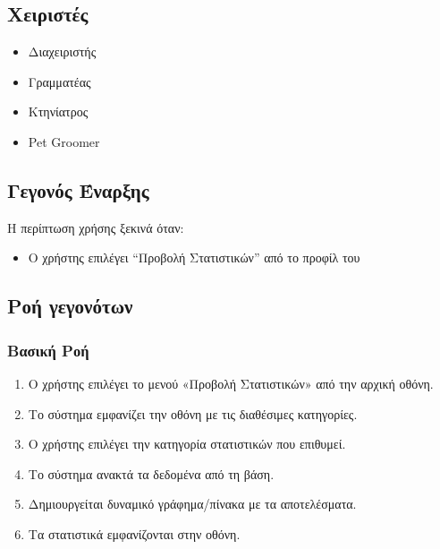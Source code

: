 \documentclass[12pt,a4paper,twoside]{book}
\begin{document}
\subsection{Χειριστές}
\begin{itemize}
  \item Διαχειριστής
  \item Γραμματέας
  \item Κτηνίατρος
  \item Pet Groomer
\end{itemize}

\subsection{Γεγονός Έναρξης}
Η περίπτωση χρήσης ξεκινά όταν:
\begin{itemize}
  \item Ο χρήστης επιλέγει “Προβολή Στατιστικών” από το προφίλ του   %
\end{itemize}

\subsection{Ροή γεγονότων}

\subsubsection{Βασική Ροή}
\begin{enumerate}
  \item Ο χρήστης επιλέγει το μενού «Προβολή Στατιστικών» από την αρχική οθόνη. %
  \item Το σύστημα εμφανίζει την οθόνη με τις διαθέσιμες κατηγορίες. %
  \item Ο χρήστης επιλέγει την κατηγορία στατιστικών  που επιθυμεί.  %
  \item Το σύστημα ανακτά τα δεδομένα από τη βάση. %
  \item Δημιουργείται δυναμικό γράφημα/πίνακα με τα αποτελέσματα. %
  \item Τα στατιστικά εμφανίζονται στην οθόνη. %
\end{enumerate}
\end{document}
